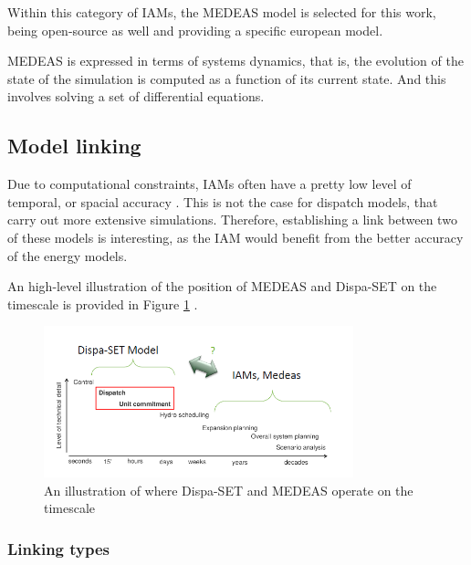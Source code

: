 Within this category of IAMs, the MEDEAS model \cite{MEDEAS} is selected for this work, being open-source as well and providing a specific european model.

MEDEAS is expressed in terms of systems dynamics, that is, the evolution of the state of the simulation is computed as a function of its current state. And this involves solving a set of differential equations.

\subsection{Model linking}

Due to computational constraints, IAMs often have a pretty low level of temporal, or spacial accuracy \cite{linkings-stuff}. This is not the case for dispatch models, that carry out more extensive simulations. Therefore, establishing a link between two of these models is interesting, as the IAM would benefit from the better accuracy of the energy models. 

An high-level illustration of the position of MEDEAS and Dispa-SET on the timescale is provided in Figure \ref{fig:dispaset-medeas-timescale} \cite{dispaset}.

\begin{figure}[h]
    \centering
    \includegraphics[width=0.8\textwidth]{resources/images/dispaset-medeas-timescale.png}
    \caption{An illustration of where Dispa-SET and MEDEAS operate on the timescale}
    \label{fig:dispaset-medeas-timescale}
\end{figure}

\subsubsection{Linking types}

